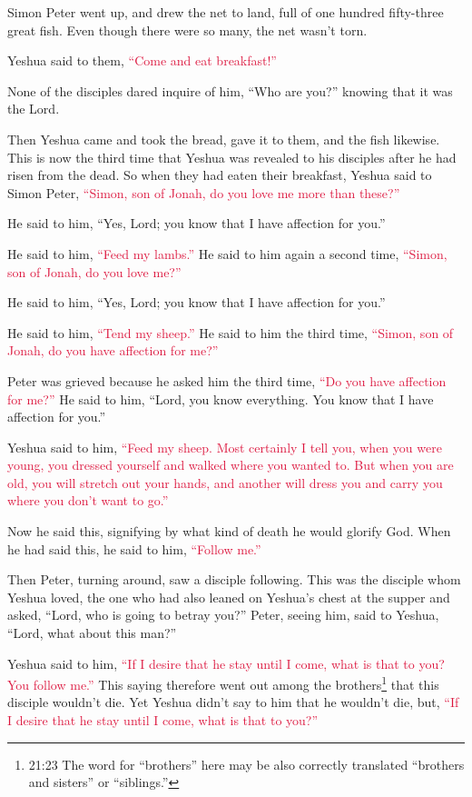 \myverse{}Simon Peter went up, and drew the net to land, full of one hundred
fifty-three great fish. Even though there were so many, the net wasn’t torn.

\myverse{}Yeshua said to them,
\textcolor{crimson}{“Come and eat breakfast!”}

None of the disciples dared inquire of him, “Who are you?” knowing that it was the Lord.

\myverse{}Then Yeshua came and took the bread, gave it to them, and the
fish likewise.
\myverse{}This is now the third time that Yeshua was revealed to his disciples after
he had risen from the dead.
\myverse{}So when they had eaten their breakfast, Yeshua said to Simon Peter,
\textcolor{crimson}{“Simon, son of Jonah, do you love me more than these?”}

He said to him, “Yes, Lord; you know that I have affection for you.”

He said to him,
\textcolor{crimson}{“Feed my lambs.”}
\myverse{}He said to him again a second time,
\textcolor{crimson}{“Simon, son of Jonah, do you love me?”}

He said to him, “Yes, Lord; you know that I have affection for you.”

He said to him,
\textcolor{crimson}{“Tend my sheep.”}
\myverse{}He said to him the third time,
\textcolor{crimson}{“Simon, son of Jonah, do you have affection for me?”}

Peter was grieved because he asked him the third time,
\textcolor{crimson}{“Do you have affection for me?”} He said to him, “Lord, you know everything. You know that I have
affection for you.”

Yeshua said to him,
\textcolor{crimson}{“Feed my sheep.
}
\myverse{}\textcolor{crimson}{Most certainly I tell you, when you were young, you dressed yourself
	and walked where you wanted to. But when you are old, you will stretch out your hands, and another will
	dress you and carry you where you don’t want to go.”}

\myverse{}Now he said this, signifying by what kind of death he would
glorify God. When he had said this, he said to him,
\textcolor{crimson}{“Follow me.”}

\myverse{}Then Peter, turning around, saw a disciple following. This was
the disciple whom Yeshua loved, the one who had also leaned on Yeshua’s chest at the supper and asked,
“Lord, who is going to betray you?”
\myverse{}Peter, seeing him, said to Yeshua, “Lord, what about this man?”

\myverse{}Yeshua said to him,
\textcolor{crimson}{“If I desire that he stay until I come, what is that to you? You follow me.”}
\myverse{}This saying therefore went out among the brothers\footnote{21:23 The word for “brothers” here may be also correctly translated “brothers and sisters” or “siblings.”}
that this disciple wouldn’t die. Yet Yeshua didn’t say to him that he wouldn’t die, but,
\textcolor{crimson}{“If I desire that he stay until I come, what is that to you?”}

